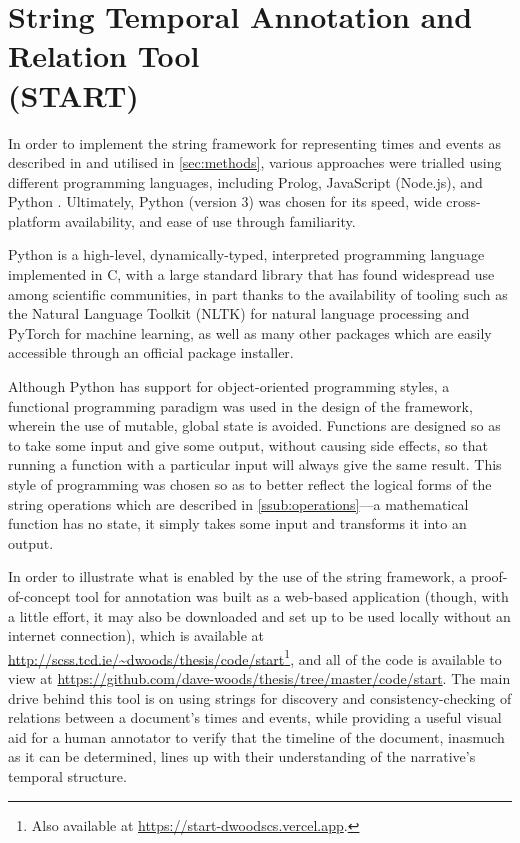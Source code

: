 \documentclass[a4paper,12pt,leqno,twoside]{article}
\begin{document}
\newpage
\section[String Temporal Annotation and Relation Tool (START)]{String Temporal Annotation and Relation Tool\\(START)}\label{sec:implementation}
In order to implement the string framework for representing times and events as described in  and utilised in \cref{sec:methods}, various approaches were trialled using different programming languages, including Prolog, JavaScript (Node.js), and Python \citep[see][respectively for more on each]{clocksin2012programming,tilkov2010node,kuhlman2009python}. Ultimately, Python (version 3) was chosen for its speed, wide cross-platform availability, and ease of use through familiarity.

Python is a high-level, dynamically-typed, interpreted programming language implemented in C, with a large standard library that has found widespread use among scientific communities, in part thanks to the availability of tooling such as the Natural Language Toolkit (NLTK) \citep{Bird2009} for natural language processing and PyTorch \citep{ketkar2017introduction} for machine learning, as well as many other packages which are easily accessible through an official package installer.

Although Python has support for object-oriented programming styles, a functional programming paradigm was used in the design of the framework, wherein the use of mutable, global state is avoided. Functions are designed so as to take some input and give some output, without causing side effects, so that running a function with a particular input will always give the same result. This style of programming was chosen so as to better reflect the logical forms of the string operations which are described in \cref{ssub:operations}---a mathematical function has no state, it simply takes some input and transforms it into an output.

In order to illustrate what is enabled by the use of the string framework, a proof-of-concept tool for annotation was built as a web-based application (though, with a little effort, it may also be downloaded and set up to be used locally without an internet connection), which is available at \url{http://scss.tcd.ie/~dwoods/thesis/code/start}\footnote{Also available at \url{https://start-dwoodscs.vercel.app}.}, and all of the code is available to view at \url{https://github.com/dave-woods/thesis/tree/master/code/start}. The main drive behind this tool is on using strings for discovery and consistency-checking of relations between a document's times and events, while providing a useful visual aid for a human annotator to verify that the timeline of the document, inasmuch as it can be determined, lines up with their understanding of the narrative's temporal structure.
\end{document}
